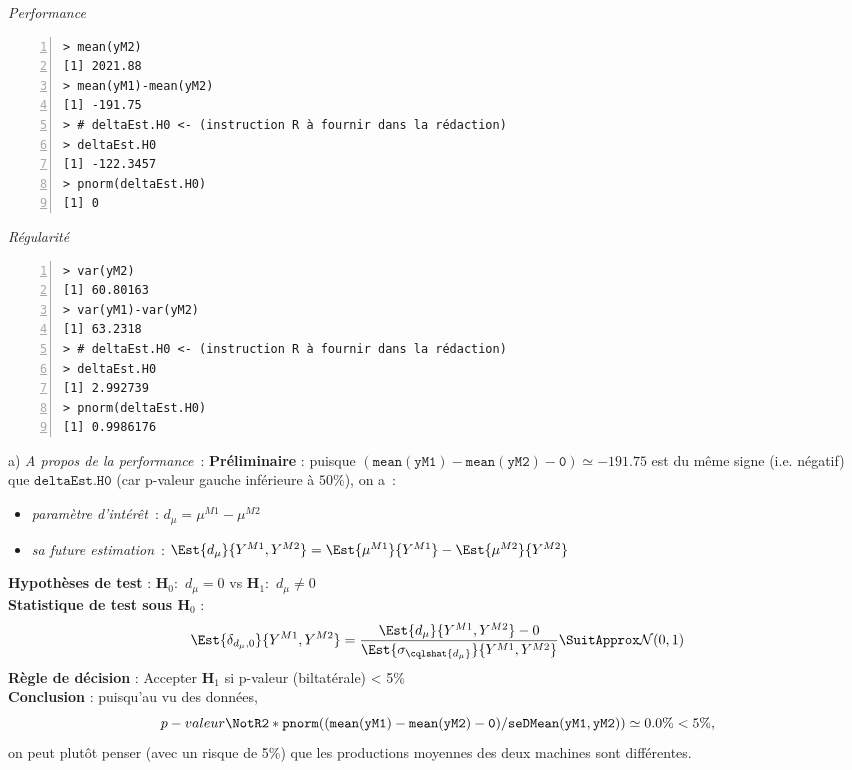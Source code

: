 \documentclass[10pt]{report}
\begin{document}
\begin{exercice}
\IndicR
\noindent \textit{Performance}
\begin{Verbatim}[frame=leftline,fontfamily=tt,fontshape=n,numbers=left]
> mean(yM2)
[1] 2021.88
> mean(yM1)-mean(yM2)
[1] -191.75
> # deltaEst.H0 <- (instruction R à fournir dans la rédaction)
> deltaEst.H0
[1] -122.3457
> pnorm(deltaEst.H0)
[1] 0
\end{Verbatim}

\noindent \textit{Régularité}
\begin{Verbatim}[frame=leftline,fontfamily=tt,fontshape=n,numbers=left]
> var(yM2)
[1] 60.80163
> var(yM1)-var(yM2)
[1] 63.2318
> # deltaEst.H0 <- (instruction R à fournir dans la rédaction)
> deltaEst.H0
[1] 2.992739
> pnorm(deltaEst.H0)
[1] 0.9986176
\end{Verbatim}



\begin{Correction}
\noindent a) \textit{A propos de la performance}~:
 \noindent \textbf{Préliminaire} : puisque $\mathtt{(mean(yM1)-mean(yM2)-0)}\simeq-191.75$ est du même signe (i.e. négatif) que $\mathtt{deltaEst.H0}$ (car p-valeur gauche inférieure à $50\%$), on a~: 
      \begin{itemize}
\item \textit{paramètre d'intérêt}~: $d_\mu=\mu^{M1}-\mu^{M2}$
\item \textit{sa future estimation}~: $\Est{d_\mu}{Y^{M1},Y^{M2}}=\Est{\mu^{M1}}{Y^{M1}}-\Est{\mu^{M2}}{Y^{M2}}$
\end{itemize}
\noindent \textbf{Hypothèses de test} : $\mathbf{H}_0:$ $d_\mu=0$ vs {\large $\mathbf{H}_1:$ $d_\mu\neq0$}\\
\textbf{Statistique de test sous $\mathbf{H}_0$} :
  $$
  \Est{\delta_{d_\mu,0}}{Y^{M1},Y^{M2}}= {\displaystyle \frac{\Est{d_\mu}{Y^{M1},Y^{M2}}-0}{
\Est{\sigma_{\cqlshat{d_\mu}}}{Y^{M1},Y^{M2}}
}} 
  \SuitApprox \mathcal{N}(0,1)
  $$
\textbf{Règle de décision} : Accepter $\mathbf{H}_1$ si 
  p-valeur (biltatérale) < 5\%\\
\noindent \textbf{Conclusion} :
puisqu'au vu des données, 
  \[
p-valeur\NotR\mathtt{2*pnorm((mean(yM1)-mean(yM2)-0)/seDMean(yM1,yM2))} \simeq 0.0\% < 5\%,
\]
on peut plutôt penser (avec un risque de 5\%) que les productions moyennes des deux machines sont diff{\'e}rentes.
  

\end{Correction}
\end{exercice}
\end{document}
